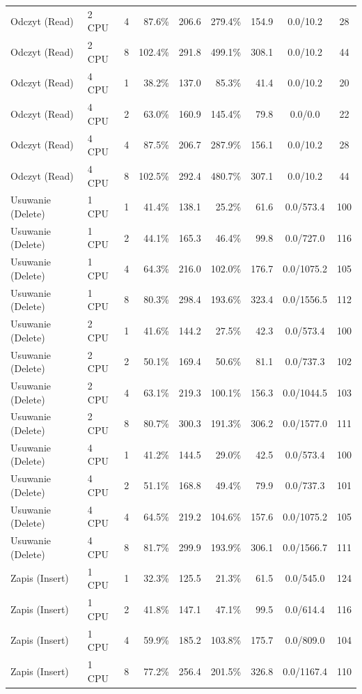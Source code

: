 \begin{table}[ht]
{\begin{tabular}{llcrrrrcc}
Odczyt (Read) & 2 CPU & 4 & 87.6\% & 206.6 & 279.4\% & 154.9 & 0.0/10.2 & 28 \\
Odczyt (Read) & 2 CPU & 8 & 102.4\% & 291.8 & 499.1\% & 308.1 & 0.0/10.2 & 44 \\
Odczyt (Read) & 4 CPU & 1 & 38.2\% & 137.0 & 85.3\% & 41.4 & 0.0/10.2 & 20 \\
Odczyt (Read) & 4 CPU & 2 & 63.0\% & 160.9 & 145.4\% & 79.8 & 0.0/0.0 & 22 \\
Odczyt (Read) & 4 CPU & 4 & 87.5\% & 206.7 & 287.9\% & 156.1 & 0.0/10.2 & 28 \\
Odczyt (Read) & 4 CPU & 8 & 102.5\% & 292.4 & 480.7\% & 307.1 & 0.0/10.2 & 44 \\
Usuwanie (Delete) & 1 CPU & 1 & 41.4\% & 138.1 & 25.2\% & 61.6 & 0.0/573.4 & 100 \\
Usuwanie (Delete) & 1 CPU & 2 & 44.1\% & 165.3 & 46.4\% & 99.8 & 0.0/727.0 & 116 \\
Usuwanie (Delete) & 1 CPU & 4 & 64.3\% & 216.0 & 102.0\% & 176.7 & 0.0/1075.2 & 105 \\
Usuwanie (Delete) & 1 CPU & 8 & 80.3\% & 298.4 & 193.6\% & 323.4 & 0.0/1556.5 & 112 \\
Usuwanie (Delete) & 2 CPU & 1 & 41.6\% & 144.2 & 27.5\% & 42.3 & 0.0/573.4 & 100 \\
Usuwanie (Delete) & 2 CPU & 2 & 50.1\% & 169.4 & 50.6\% & 81.1 & 0.0/737.3 & 102 \\
Usuwanie (Delete) & 2 CPU & 4 & 63.1\% & 219.3 & 100.1\% & 156.3 & 0.0/1044.5 & 103 \\
Usuwanie (Delete) & 2 CPU & 8 & 80.7\% & 300.3 & 191.3\% & 306.2 & 0.0/1577.0 & 111 \\
Usuwanie (Delete) & 4 CPU & 1 & 41.2\% & 144.5 & 29.0\% & 42.5 & 0.0/573.4 & 100 \\
Usuwanie (Delete) & 4 CPU & 2 & 51.1\% & 168.8 & 49.4\% & 79.9 & 0.0/737.3 & 101 \\
Usuwanie (Delete) & 4 CPU & 4 & 64.5\% & 219.2 & 104.6\% & 157.6 & 0.0/1075.2 & 105 \\
Usuwanie (Delete) & 4 CPU & 8 & 81.7\% & 299.9 & 193.9\% & 306.1 & 0.0/1566.7 & 111 \\
Zapis (Insert) & 1 CPU & 1 & 32.3\% & 125.5 & 21.3\% & 61.5 & 0.0/545.0 & 124 \\
Zapis (Insert) & 1 CPU & 2 & 41.8\% & 147.1 & 47.1\% & 99.5 & 0.0/614.4 & 116 \\
Zapis (Insert) & 1 CPU & 4 & 59.9\% & 185.2 & 103.8\% & 175.7 & 0.0/809.0 & 104 \\
Zapis (Insert) & 1 CPU & 8 & 77.2\% & 256.4 & 201.5\% & 326.8 & 0.0/1167.4 & 110 \\

\end{tabular}}
\end{table}
